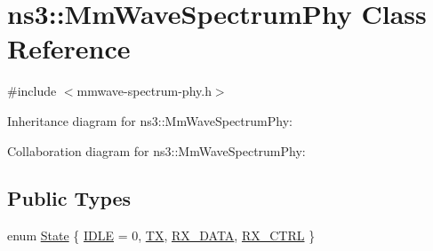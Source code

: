 \hypertarget{classns3_1_1MmWaveSpectrumPhy}{}\section{ns3\+:\+:Mm\+Wave\+Spectrum\+Phy Class Reference}
\label{classns3_1_1MmWaveSpectrumPhy}


{\ttfamily \#include $<$mmwave-\/spectrum-\/phy.\+h$>$}



Inheritance diagram for ns3\+:\+:Mm\+Wave\+Spectrum\+Phy\+:


Collaboration diagram for ns3\+:\+:Mm\+Wave\+Spectrum\+Phy\+:
\subsection*{Public Types}
\begin{DoxyCompactItemize}
\item 
enum \hyperlink{classns3_1_1MmWaveSpectrumPhy_a665335f60416cf031a9b68209e4368ae}{State} \{ \hyperlink{classns3_1_1MmWaveSpectrumPhy_a665335f60416cf031a9b68209e4368aeadae9004ebbfa9610354cf62b76eed607}{I\+D\+LE} = 0, 
\hyperlink{classns3_1_1MmWaveSpectrumPhy_a665335f60416cf031a9b68209e4368aea1009d660cb8095bc16053fc9909ae695}{TX}, 
\hyperlink{classns3_1_1MmWaveSpectrumPhy_a665335f60416cf031a9b68209e4368aea5283250c41727eee6b26940406b690d9}{R\+X\+\_\+\+D\+A\+TA}, 
\hyperlink{classns3_1_1MmWaveSpectrumPhy_a665335f60416cf031a9b68209e4368aea1f35c17b447eeb9d376715d1910540fc}{R\+X\+\_\+\+C\+T\+RL}
 \}
\end{DoxyCompactItemize}
